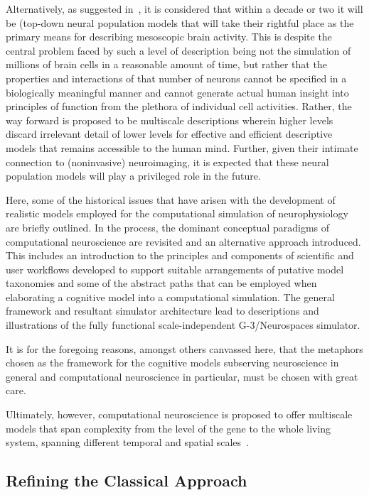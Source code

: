 \documentclass[11pt,3p,twocolumn]{JMN}
\begin{document}
Alternatively, as suggested in~\citep{bojak22}, it is considered that within a decade or two it will be (top-down neural population models that will take their rightful place as the primary means for describing mesoscopic brain activity. This is despite the central problem faced by such a level of description being not the simulation of millions of brain cells in a reasonable amount of time, but rather that the properties and interactions of that number of neurons cannot be specified in a biologically meaningful manner and cannot generate actual human insight into principles of function from the plethora of individual cell activities. Rather, the way forward is proposed to be multiscale descriptions wherein higher levels discard irrelevant detail of lower levels for effective and efficient descriptive models that remains accessible to the human mind. Further, given their intimate connection to (noninvasive) neuroimaging, it is expected that these neural population models will play a privileged role in the future.

Here, some of the historical issues that have arisen with the development of realistic models employed for the computational simulation of neurophysiology are briefly outlined. In the process, the dominant conceptual paradigms of computational neuroscience are revisited and an alternative approach introduced. This includes an introduction to the principles and components of scientific and user workflows developed to support suitable arrangements of putative model taxonomies and some of the abstract paths that can be employed when elaborating a cognitive model into a computational simulation. The general framework and resultant simulator architecture lead to descriptions and illustrations of the fully functional scale-independent G-3/Neurospaces simulator.

It is for the foregoing reasons, amongst others canvassed here, that the metaphors chosen as the framework for the cognitive models subserving neuroscience in general and computational neuroscience in particular, must be chosen with great care.

Ultimately, however, computational neuroscience is proposed to offer multiscale models that span complexity from the level of the gene to the whole living system, spanning different temporal and spatial scales~\citep{jung22}.

\subsection{Refining the Classical Approach}
\end{document}
